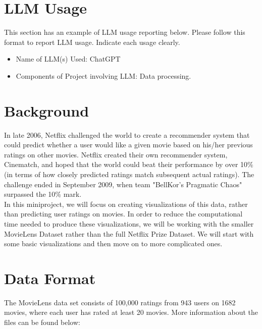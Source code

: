 \section{LLM Usage}
This section has an example of LLM usage reporting below. Please follow this format to report LLM usage. Indicate each usage clearly.
\begin{itemize}
    \item Name of LLM(s) Used: ChatGPT
    \item Components of Project involving LLM: Data processing.
\end{itemize}


\section{Background}
In late 2006, Netflix challenged the world to create a recommender system that could predict whether a user would like a given movie based on his/her previous ratings on other movies. Netflix created their own recommender system, Cinematch, and hoped that the world could beat their performance by over 10\% (in terms of how closely predicted ratings match subsequent actual ratings). The challenge ended in September 2009, when team "BellKor's Pragmatic Chaos" surpassed the 10\% mark. \\

In this miniproject, we will focus on creating visualizations of this data, rather than predicting user ratings on movies. In order to reduce the computational time needed to produce these visualizations, we will be working with the smaller MovieLens Dataset rather than the full Netflix Prize Dataset. We will start with some basic visualizations and then move on to more complicated ones.

\section{Data Format}
The MovieLens data set consists of 100,000 ratings from 943 users on 1682 movies, where each user has rated at least 20 movies. More information about the files can be found below:


